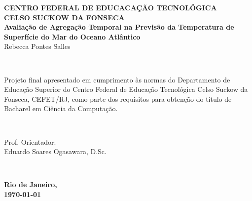 \documentclass[12pt]{report} %
\begin{document}
	\begin{minipage}{\textwidth}
		\begin{center}
			{\bfseries \large CENTRO FEDERAL DE EDUCACAÇÃO TECNOLÓGICA\\ CELSO SUCKOW DA FONSECA}\\[6em]
			{\bfseries \LARGE Avaliação de Agregação Temporal na Previsão da Temperatura de Superfície do Mar do Oceano Atlântico}\\[6em]%
			\raggedleft Rebecca Pontes Salles
		\end{center}
	\end{minipage}\\[6em]
	
	\begin{flushright}
		\begin{minipage}{0.5\textwidth}
			\normalsize
			\raggedleft
			Projeto final apresentado em cumprimento às normas do Departamento de Educação Superior do Centro Federal de Educação Tecnológica Celso Suckow da Fonseca, CEFET/RJ, como parte dos requisitos para obtenção do título de Bacharel em Ciência da Computação.
		\end{minipage}\\[6em]
	\end{flushright}
	
	\begin{flushright}
		\begin{minipage}{0.5\textwidth}
			\raggedleft
			Prof. Orientador: \\
			Eduardo Soares Ogasawara, D.Sc.
		\end{minipage}\\
	\end{flushright}
	\vfill	
	{\bfseries \large Rio de Janeiro,\\
		\today} %
	
	\pagebreak
	
	
	
	
	\iffalse %
	\center %
	
\end{document}
